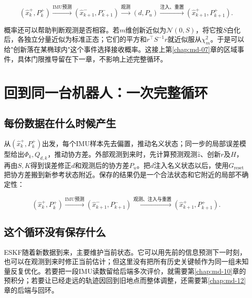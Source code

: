 \begin{equation*}
(\hat x_k^+,P_k^+)
 \xrightarrow{\text{IMU预测}}(\hat x_{k+1}^-,P_{k+1}^-)
 \xrightarrow{\text{观测}}(d,P_u)
 \xrightarrow{\text{注入、重置}}(\hat x_{k+1}^+,P_{k+1}^+).
\end{equation*}

概率还可以帮助判断观测是否相容。若$m$维创新近似为$\mathcal N(0,S)$，将它按$S$白化后，各独立分量近似为标准正态；它们的平方和$r^\top S^{-1}r$就近似服从$\chi_m^2$。于是可以给"创新落在某椭球内"这个事件选择接收概率。这接上第\ref{chap:md-07}章的区域事件，具体门限推导留在下一章，不影响上述完整循环。

\section{回到同一台机器人：一次完整循环}

\subsection{每份数据在什么时候产生}

从$(\hat x_k^+,P_k^+)$出发，每个IMU样本先去偏置，推动名义状态；同一步的局部误差模型给出$\Phi_k,Q_{d,k}$，推动协方差。外部观测到来时，先计算预测观测$\hat z$、创新$r$及$H$，再由$S,K$得到误差修正$d$和观测后的协方差$P_u$。把$d$注入名义状态以后，使用$G_{\mathrm{reset}}$把协方差搬到新参考状态附近。保存的结果仍是一个合法状态和它附近的局部不确定性：

\begin{equation*}
(\hat x_k^+,P_k^+)
\xrightarrow{\text{IMU预测}}
(\hat x_{k+1}^-,P_{k+1}^-)
\xrightarrow{\text{观测、注入与重置}}
(\hat x_{k+1}^+,P_{k+1}^+).
\end{equation*}

\subsection{这个循环没有保存什么}

ESKF随着新数据到来，主要维护当前状态。它可以用先前的信息预测下一时刻，也可以在观测到来时修正当前估计；但这里没有把所有历史关键帧作为同一组未知量反复优化。若要把一段IMU读数留给后端多次评价，就需要第\ref{chap:md-10}章的预积分；若要让已经走远的轨迹因回到旧地点而整体调整，还需要第\ref{chap:md-12}章的后端与回环。
